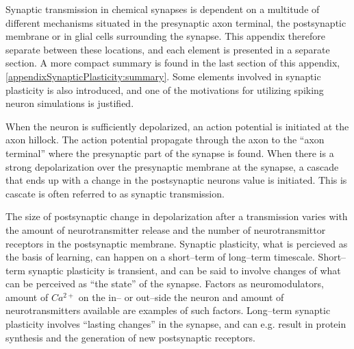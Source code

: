 Synaptic transmission in chemical synapses is dependent on a multitude of different mechanisms situated in the presynaptic axon terminal, the postsynaptic membrane or in glial cells surrounding the synapse.
This appendix therefore separate between these locations, and each element is presented in a separate section.
A more compact summary is found in the last section of this appendix, \ref{appendixSynapticPlasticity:summary}.
Some elements involved in synaptic plasticity is also introduced, and one of the motivations for utilizing spiking neuron simulations is justified.


When the neuron is sufficiently depolarized, an action potential is initiated at the axon hillock.
The action potential propagate through the axon to the ``axon terminal'' where the presynaptic part of the synapse is found.
When there is a strong depolarization over the presynaptic membrane at the synapse, a cascade that ends up with a change in the postsynaptic neurons value is initiated\cite{PurvesNeuroscienceKAP05}.
This is cascate is often referred to as synaptic transmission. 

The size of postsynaptic change in depolarization after a transmission varies with the amount of neurotransmitter release and the number of neurotransmittor receptors in the postsynaptic membrane\cite{PurvesNeuroscienceKAP05}.
Synaptic plasticity, what is percieved as the basis of learning, can happen on a short--term of long--term timescale.
Short--term synaptic plasticity is transient, and can be said to involve changes of what can be perceived as ``the state'' of the synapse.
Factors as neuromodulators, amount of $Ca^{2+}$ on the in-- or out--side the neuron and amount of neurotransmitters available are examples of such factors.
Long--term synaptic plasticity involves ``lasting changes'' in the synapse, and can e.g. result in protein synthesis and the generation of new postsynaptic receptors\cite{PurvesNeuroscienceKAP8}. %

